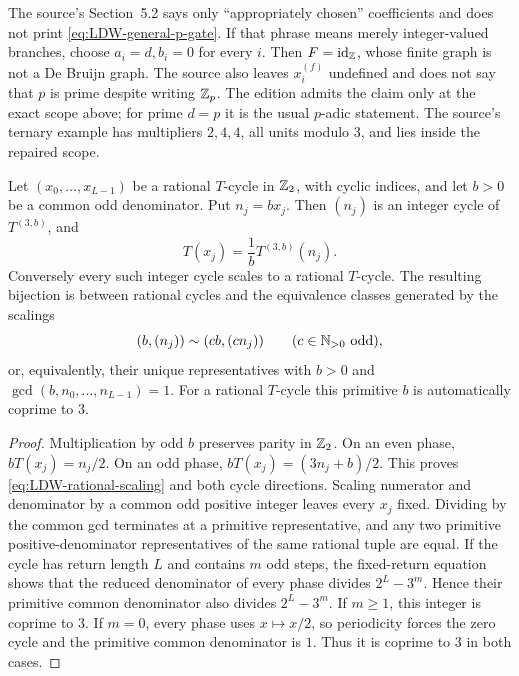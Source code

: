 The source's Section~5.2 says only ``appropriately chosen'' coefficients and
does not print \eqref{eq:LDW-general-p-gate}.  If that phrase means merely
integer-valued branches, choose $a_i=d,b_i=0$ for every $i$.  Then
$F=\operatorname{id}_{\mathbb{Z}}$, whose finite graph is not a De Bruijn graph.  The
source also leaves $x_i^{(f)}$ undefined and does not say that $p$ is prime
despite writing $\mathbb{Z}_p$.  The edition admits the claim only at the exact scope
above; for prime $d=p$ it is the usual $p$-adic statement.  The source's
ternary example has multipliers $2,4,4$, all units modulo $3$, and lies inside
the repaired scope.

\begin{proposition}
\label{prop:LDW-rational-cycle-scaling}
Let $(x_0,\ldots,x_{L-1})$ be a rational $T$-cycle in $\mathbb{Z}_{2}$, with cyclic
indices, and let $b>0$ be a common odd denominator.  Put $n_j=bx_j$.  Then
$(n_j)$ is an integer cycle of $T^{(3,b)}$, and
\begin{equation}
\label{eq:LDW-rational-scaling}
 T(x_j)=\frac1bT^{(3,b)}(n_j).
\end{equation}
Conversely every such integer cycle scales to a rational $T$-cycle.  The
resulting bijection is between rational cycles and the equivalence classes
generated by the scalings
\begin{equation}
\label{eq:LDW-scaling-equivalence}
 (b,(n_j))\sim(cb,(cn_j))
 \qquad(c\in\mathbb{N}_{>0}\text{ odd}),
\end{equation}
or, equivalently, their unique representatives with $b>0$ and
$\gcd(b,n_0,\ldots,n_{L-1})=1$.  For a rational $T$-cycle this primitive
$b$ is automatically coprime to $3$.
\end{proposition}

\begin{proof}
Multiplication by odd $b$ preserves parity in $\mathbb{Z}_{2}$.  On an even phase,
$bT(x_j)=n_j/2$.  On an odd phase,
$bT(x_j)=(3n_j+b)/2$.  This proves
\eqref{eq:LDW-rational-scaling} and both cycle directions.  Scaling numerator
and denominator by a common odd positive integer leaves every $x_j$ fixed.
Dividing by the common gcd terminates at a primitive representative, and any
two primitive positive-denominator representatives of the same rational
tuple are equal.  If the cycle has return length $L$ and contains $m$ odd
steps, the fixed-return equation shows that the reduced denominator of every
phase divides $2^L-3^m$.  Hence their primitive common denominator also
divides $2^L-3^m$.  If $m\geq1$, this integer is coprime to $3$.  If $m=0$,
every phase uses $x\mapsto x/2$, so periodicity forces the zero cycle and the
primitive common denominator is $1$.  Thus it is coprime to $3$ in both
cases.
\end{proof}

